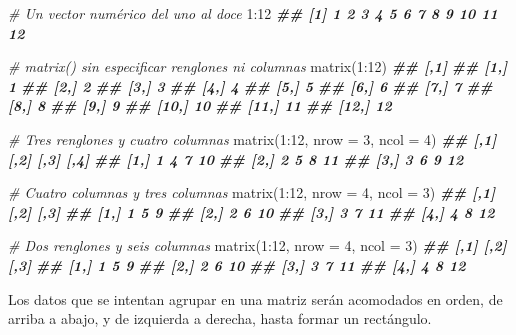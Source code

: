 \documentclass[
]{book}
\newenvironment{Shaded}{\begin{snugshade}}{\end{snugshade}}
\newcommand{\AttributeTok}[1]{\textcolor[rgb]{0.77,0.63,0.00}{#1}}
\newcommand{\CommentTok}[1]{\textcolor[rgb]{0.56,0.35,0.01}{\textit{#1}}}
\newcommand{\DecValTok}[1]{\textcolor[rgb]{0.00,0.00,0.81}{#1}}
\newcommand{\DocumentationTok}[1]{\textcolor[rgb]{0.56,0.35,0.01}{\textbf{\textit{#1}}}}
\newcommand{\FunctionTok}[1]{\textcolor[rgb]{0.00,0.00,0.00}{#1}}
\newcommand{\NormalTok}[1]{#1}
\newcommand{\SpecialCharTok}[1]{\textcolor[rgb]{0.00,0.00,0.00}{#1}}
\begin{document}
\begin{Shaded}
\begin{Highlighting}[]
\CommentTok{\# Un vector numérico del uno al doce}
\DecValTok{1}\SpecialCharTok{:}\DecValTok{12}
\DocumentationTok{\#\#  [1]  1  2  3  4  5  6  7  8  9 10 11 12}

\CommentTok{\# matrix() sin especificar renglones ni columnas}
\FunctionTok{matrix}\NormalTok{(}\DecValTok{1}\SpecialCharTok{:}\DecValTok{12}\NormalTok{)}
\DocumentationTok{\#\#       [,1]}
\DocumentationTok{\#\#  [1,]    1}
\DocumentationTok{\#\#  [2,]    2}
\DocumentationTok{\#\#  [3,]    3}
\DocumentationTok{\#\#  [4,]    4}
\DocumentationTok{\#\#  [5,]    5}
\DocumentationTok{\#\#  [6,]    6}
\DocumentationTok{\#\#  [7,]    7}
\DocumentationTok{\#\#  [8,]    8}
\DocumentationTok{\#\#  [9,]    9}
\DocumentationTok{\#\# [10,]   10}
\DocumentationTok{\#\# [11,]   11}
\DocumentationTok{\#\# [12,]   12}

\CommentTok{\# Tres renglones y cuatro columnas}
\FunctionTok{matrix}\NormalTok{(}\DecValTok{1}\SpecialCharTok{:}\DecValTok{12}\NormalTok{, }\AttributeTok{nrow =} \DecValTok{3}\NormalTok{, }\AttributeTok{ncol =} \DecValTok{4}\NormalTok{)}
\DocumentationTok{\#\#      [,1] [,2] [,3] [,4]}
\DocumentationTok{\#\# [1,]    1    4    7   10}
\DocumentationTok{\#\# [2,]    2    5    8   11}
\DocumentationTok{\#\# [3,]    3    6    9   12}

\CommentTok{\# Cuatro columnas y tres columnas}
\FunctionTok{matrix}\NormalTok{(}\DecValTok{1}\SpecialCharTok{:}\DecValTok{12}\NormalTok{, }\AttributeTok{nrow =} \DecValTok{4}\NormalTok{, }\AttributeTok{ncol =} \DecValTok{3}\NormalTok{)}
\DocumentationTok{\#\#      [,1] [,2] [,3]}
\DocumentationTok{\#\# [1,]    1    5    9}
\DocumentationTok{\#\# [2,]    2    6   10}
\DocumentationTok{\#\# [3,]    3    7   11}
\DocumentationTok{\#\# [4,]    4    8   12}

\CommentTok{\# Dos renglones y seis columnas}
\FunctionTok{matrix}\NormalTok{(}\DecValTok{1}\SpecialCharTok{:}\DecValTok{12}\NormalTok{, }\AttributeTok{nrow =} \DecValTok{4}\NormalTok{, }\AttributeTok{ncol =} \DecValTok{3}\NormalTok{)}
\DocumentationTok{\#\#      [,1] [,2] [,3]}
\DocumentationTok{\#\# [1,]    1    5    9}
\DocumentationTok{\#\# [2,]    2    6   10}
\DocumentationTok{\#\# [3,]    3    7   11}
\DocumentationTok{\#\# [4,]    4    8   12}
\end{Highlighting}
\end{Shaded}

Los datos que se intentan agrupar en una matriz serán acomodados en orden, de arriba a abajo, y de izquierda a derecha, hasta formar un rectángulo.
\end{document}
